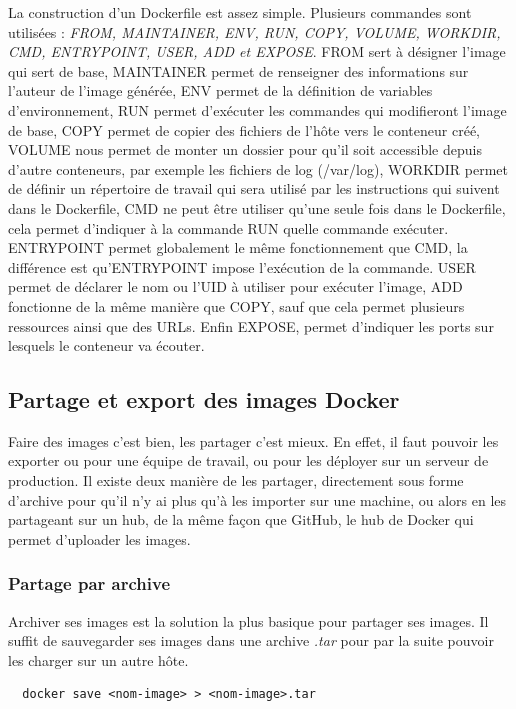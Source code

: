 \documentclass[12pt,a4paper]{article}
\begin{document}
La construction d'un Dockerfile est assez simple. Plusieurs commandes sont utilisées : \textit{FROM, MAINTAINER, ENV, RUN, COPY, VOLUME, WORKDIR, CMD, ENTRYPOINT, USER, ADD et EXPOSE}. FROM sert à désigner l'image qui sert de base, MAINTAINER permet de renseigner des informations sur l'auteur de l'image générée, ENV permet de la définition de variables d'environnement, RUN permet d'exécuter les commandes qui modifieront l'image de base, COPY permet de copier des fichiers de l'hôte vers le conteneur créé, VOLUME nous permet de monter un dossier pour qu'il soit accessible depuis d'autre conteneurs, par exemple les fichiers de log (/var/log), WORKDIR permet de définir un répertoire de travail qui sera utilisé par les instructions qui suivent dans le Dockerfile, CMD ne peut être utiliser qu'une seule fois dans le Dockerfile, cela permet d'indiquer à la commande RUN quelle commande exécuter. ENTRYPOINT permet globalement le même fonctionnement que CMD, la différence est qu'ENTRYPOINT impose l'exécution de la commande. USER permet de déclarer le nom ou l'UID à utiliser pour exécuter l'image, ADD fonctionne de la même manière que COPY, sauf que cela permet plusieurs ressources ainsi que des URLs. Enfin EXPOSE, permet d'indiquer les ports sur lesquels le conteneur va écouter. 

\subsection{Partage et export des images Docker}

Faire des images c'est bien, les partager c'est mieux. En effet, il faut pouvoir les exporter ou pour une équipe de travail, ou pour les déployer sur un serveur de production. Il existe deux manière de les partager, directement sous forme d'archive pour qu'il n'y ai plus qu'à les importer sur une machine, ou alors en les partageant sur un hub, de la même façon que GitHub, le hub de Docker qui permet d'uploader les images.

\subsubsection{Partage par archive}

Archiver ses images est la solution la plus basique pour partager ses images. Il suffit de sauvegarder ses images dans une archive \textit{.tar} pour par la suite pouvoir les charger sur un autre hôte.
\begin{lstlisting}
  docker save <nom-image> > <nom-image>.tar
\end{lstlisting}
\end{document}

